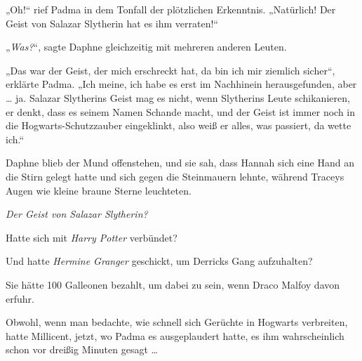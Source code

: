 „Oh!“ rief Padma in dem Tonfall der plötzlichen Erkenntnis.
„Natürlich! Der Geist von Salazar Slytherin hat es ihm verraten!“

„\emph{Was?}“, sagte Daphne gleichzeitig mit mehreren anderen Leuten.

„Das war der Geist, der mich erschreckt hat, da bin ich mir ziemlich sicher“, erklärte Padma.
„Ich meine, ich habe es erst im Nachhinein herausgefunden, aber … ja. Salazar Slytherins Geist mag es nicht, wenn Slytherins Leute schikanieren, er denkt, dass es seinem Namen Schande macht, und der Geist ist immer noch in die Hogwarts-Schutzzauber eingeklinkt, also weiß er alles, was passiert, da wette ich.“

Daphne blieb der Mund offenstehen, und sie sah, dass Hannah sich eine Hand an die Stirn gelegt hatte und sich gegen die Steinmauern lehnte, während Traceys Augen wie kleine braune Sterne leuchteten.

\emph{Der Geist von Salazar Slytherin?}

Hatte sich mit \emph{Harry Potter} verbündet?

Und hatte \emph{Hermine Granger} geschickt, um Derricks Gang aufzuhalten?

Sie hätte 100 Galleonen bezahlt, um dabei zu sein, wenn Draco Malfoy davon erfuhr.

Obwohl, wenn man bedachte, wie schnell sich Gerüchte in Hogwarts verbreiten, hatte Millicent, jetzt, wo Padma es ausgeplaudert hatte, es ihm wahrscheinlich schon vor dreißig Minuten gesagt …

